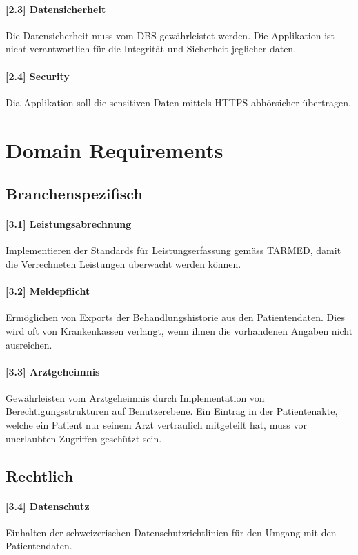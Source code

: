 \documentclass[a4paper]{scrreprt}
\begin{document}
\paragraph{[2.3] Datensicherheit}
Die Datensicherheit muss vom DBS gewährleistet werden. Die Applikation ist nicht verantwortlich für die Integrität und Sicherheit jeglicher daten.
 
\paragraph{[2.4] Security}
Dia Applikation soll die sensitiven Daten mittels HTTPS abhörsicher übertragen. 

\section{Domain Requirements}
\subsection{Branchenspezifisch}
\paragraph{[3.1] Leistungsabrechnung} Implementieren der Standards für Leistungserfassung gemäss TARMED, damit die Verrechneten Leistungen überwacht werden können.

\paragraph{[3.2] Meldepflicht} Ermöglichen von Exports der Behandlungshistorie aus den Patientendaten. Dies wird oft von Krankenkassen verlangt, wenn ihnen die vorhandenen Angaben nicht ausreichen.

\paragraph{[3.3] Arztgeheimnis} Gewährleisten vom Arztgeheimnis durch Implementation von Berechtigungsstrukturen auf Benutzerebene. Ein Eintrag in der Patientenakte, welche ein Patient nur seinem Arzt vertraulich mitgeteilt hat, muss vor unerlaubten Zugriffen geschützt sein.


\subsection{Rechtlich}
\paragraph{[3.4] Datenschutz} Einhalten der schweizerischen Datenschutzrichtlinien für den Umgang mit den Patientendaten.
\end{document}
